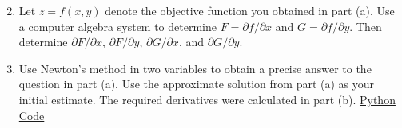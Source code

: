 \documentclass[12pt, oneside]{book}
\newenvironment{solution}{\textit{Solution.}}
\newcommand{\sol}[1]{
    \begin{customframedproof}[linecolor=orangehdx!75,]
        \begin{solution}
        #1
        \end{solution}
    \end{customframedproof}
}
\begin{document}
\begin{enumerate}
    \begin{enumerate}
        \setcounter{enumii}{1}
        \item Let \(z = f(x, y)\) denote the objective function you obtained in part (a). Use a computer algebra system to determine \(F = \partial f /\partial x\) and \( G = \partial f /\partial y\). Then determine \(\partial F/\partial x\), \(\partial F/\partial y\), \(\partial G/\partial x\), and \(\partial G/\partial y\).
        \item Use Newton’s method in two variables to obtain a precise answer to the question in part (a). Use the approximate solution from part (a) as your initial estimate. The required derivatives were calculated in part (b). \hyperref[ex:5]{Python Code}
    \end{enumerate}
\end{enumerate}

\newpage
\end{document}
